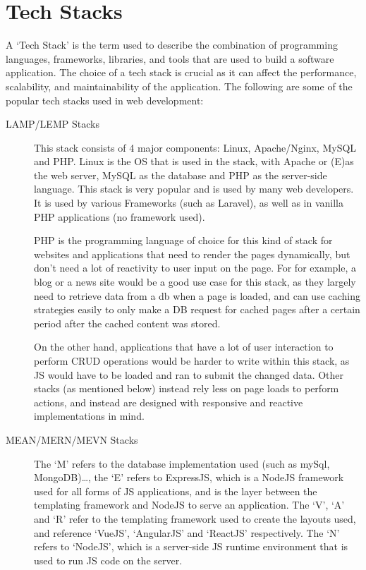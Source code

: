 \documentclass[12pt, a4paper,twoside]{report}
\theoremstyle{plain} %
\theoremstyle{definition} %
\numberwithin{equation}{chapter}
\begin{document}
\section{Tech Stacks}\label{sec:techstacks}

A `Tech Stack' is the term used to describe the combination of programming
languages, frameworks, libraries, and tools that are used to build a software
application. The choice of a tech stack is crucial as it can affect the
performance, scalability, and maintainability of the application. The following
are some of the popular tech stacks used in web development:

\begin{description}
    \item[LAMP/LEMP Stacks] {
        This stack consists of 4 major components: Linux, Apache/Nginx, MySQL
        and PHP\@. Linux is the OS that is used in the stack, with Apache or
        (E)\@nginx as the web server, MySQL as the database and PHP as the
        server-side language. This stack is very popular and is used by many
        web developers. It is used by various Frameworks (such as Laravel), as
        well as in vanilla PHP applications (no framework used).

        PHP is the programming language of choice for this kind of stack for
        websites and applications that need to render the pages dynamically,
        but don't need a lot of reactivity to user input on the page. For
        for example, a blog or a news site would be a good use case for this
        stack, as they largely need to retrieve data from a db when a page is
        loaded, and can use caching strategies easily to only make a DB request
        for cached pages after a certain period after the cached content was stored.

        On the other hand, applications that have a lot of user interaction to perform
        CRUD operations would be harder to write within this stack, as JS would have
        to be loaded and ran to submit the changed data. Other stacks (as mentioned below)
        instead rely less on page loads to perform actions, and instead are designed
        with responsive and reactive implementations in mind.
        }
    \item[MEAN/MERN/MEVN Stacks] {
        The `M' refers to the database implementation used (such as mySql, MongoDB)\ldots,
        the `E' refers to ExpressJS, which is a NodeJS framework used for all forms of
        JS applications, and is the layer between the templating framework and NodeJS to
        serve an application. The `V', `A' and `R' refer to the templating framework used
        to create the layouts used, and reference `VueJS', `AngularJS' and `ReactJS'
        respectively. The `N' refers to `NodeJS', which is a server-side JS runtime
        environment that is used to run JS code on the server.

}
\end{description}
\end{document}
